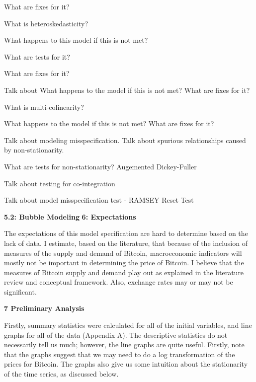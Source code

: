 \documentclass{article}[10 pt]
\newcommand{\vs}{\vspace{0.1in}}
\begin{document}
What are fixes for it?

\vs

What is heteroskedasticity?

\vs

What happens to this model if this is not met?

\vs

What are tests for it? 

\vs

What are fixes for it?

\vs

Talk about What happens to the model if this is not met? What are fixes for it?

\vs

What is multi-colinearity?

\vs

What happens to the model if this is not met? What are fixes for it?

\vs

Talk about modeling misspecification. Talk about spurious relationships
caused by non-stationarity. 

\vs

What are tests for non-stationarity? Augemented Dickey-Fuller

\vs

Talk about testing for co-integration

\vs

Talk about model misspecification test - RAMSEY Reset Test

\vs

\textbf{5.2: Bubble Modeling}
\textbf{6: Expectations}

\vs

The expectations of this model specification are hard to determine based on
the lack of data. I estimate, based on the literature, that because of the
inclusion of measures of the supply and demand of Bitcoin, macroeconomic
indicators will mostly not be important in determining the price of Bitcoin.
I believe that the measures of Bitcoin supply and demand play out as
explained in the literature review and conceptual framework. Also, exchange
rates may or may not be significant.

\vs

\textbf{7 Preliminary Analysis}

\vs

Firstly, summary statistics were calculated for all of the initial
variables, and line graphs for all of the data (Appendix A). The descriptive
statistics do not necessarily tell us much; however, the line graphs are
quite useful. Firstly, note that the graphs suggest that we may need to do
a log transformation of the prices for Bitcoin. The graphs also give us some
intuition about the stationarity of the time series, as discussed below.
\end{document}
